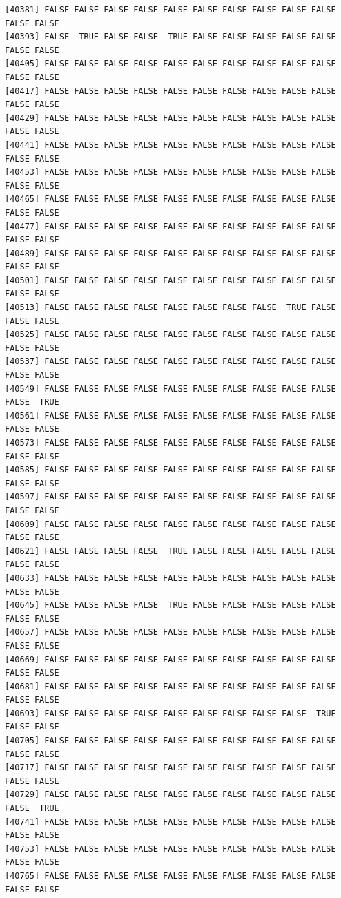\documentclass[
  a4paper,
  DIV=11,
  numbers=noendperiod]{scrartcl}
\begin{document}
\begin{verbatim}
[40381] FALSE FALSE FALSE FALSE FALSE FALSE FALSE FALSE FALSE FALSE FALSE FALSE
[40393] FALSE  TRUE FALSE FALSE  TRUE FALSE FALSE FALSE FALSE FALSE FALSE FALSE
[40405] FALSE FALSE FALSE FALSE FALSE FALSE FALSE FALSE FALSE FALSE FALSE FALSE
[40417] FALSE FALSE FALSE FALSE FALSE FALSE FALSE FALSE FALSE FALSE FALSE FALSE
[40429] FALSE FALSE FALSE FALSE FALSE FALSE FALSE FALSE FALSE FALSE FALSE FALSE
[40441] FALSE FALSE FALSE FALSE FALSE FALSE FALSE FALSE FALSE FALSE FALSE FALSE
[40453] FALSE FALSE FALSE FALSE FALSE FALSE FALSE FALSE FALSE FALSE FALSE FALSE
[40465] FALSE FALSE FALSE FALSE FALSE FALSE FALSE FALSE FALSE FALSE FALSE FALSE
[40477] FALSE FALSE FALSE FALSE FALSE FALSE FALSE FALSE FALSE FALSE FALSE FALSE
[40489] FALSE FALSE FALSE FALSE FALSE FALSE FALSE FALSE FALSE FALSE FALSE FALSE
[40501] FALSE FALSE FALSE FALSE FALSE FALSE FALSE FALSE FALSE FALSE FALSE FALSE
[40513] FALSE FALSE FALSE FALSE FALSE FALSE FALSE FALSE  TRUE FALSE FALSE FALSE
[40525] FALSE FALSE FALSE FALSE FALSE FALSE FALSE FALSE FALSE FALSE FALSE FALSE
[40537] FALSE FALSE FALSE FALSE FALSE FALSE FALSE FALSE FALSE FALSE FALSE FALSE
[40549] FALSE FALSE FALSE FALSE FALSE FALSE FALSE FALSE FALSE FALSE FALSE  TRUE
[40561] FALSE FALSE FALSE FALSE FALSE FALSE FALSE FALSE FALSE FALSE FALSE FALSE
[40573] FALSE FALSE FALSE FALSE FALSE FALSE FALSE FALSE FALSE FALSE FALSE FALSE
[40585] FALSE FALSE FALSE FALSE FALSE FALSE FALSE FALSE FALSE FALSE FALSE FALSE
[40597] FALSE FALSE FALSE FALSE FALSE FALSE FALSE FALSE FALSE FALSE FALSE FALSE
[40609] FALSE FALSE FALSE FALSE FALSE FALSE FALSE FALSE FALSE FALSE FALSE FALSE
[40621] FALSE FALSE FALSE FALSE  TRUE FALSE FALSE FALSE FALSE FALSE FALSE FALSE
[40633] FALSE FALSE FALSE FALSE FALSE FALSE FALSE FALSE FALSE FALSE FALSE FALSE
[40645] FALSE FALSE FALSE FALSE  TRUE FALSE FALSE FALSE FALSE FALSE FALSE FALSE
[40657] FALSE FALSE FALSE FALSE FALSE FALSE FALSE FALSE FALSE FALSE FALSE FALSE
[40669] FALSE FALSE FALSE FALSE FALSE FALSE FALSE FALSE FALSE FALSE FALSE FALSE
[40681] FALSE FALSE FALSE FALSE FALSE FALSE FALSE FALSE FALSE FALSE FALSE FALSE
[40693] FALSE FALSE FALSE FALSE FALSE FALSE FALSE FALSE FALSE  TRUE FALSE FALSE
[40705] FALSE FALSE FALSE FALSE FALSE FALSE FALSE FALSE FALSE FALSE FALSE FALSE
[40717] FALSE FALSE FALSE FALSE FALSE FALSE FALSE FALSE FALSE FALSE FALSE FALSE
[40729] FALSE FALSE FALSE FALSE FALSE FALSE FALSE FALSE FALSE FALSE FALSE  TRUE
[40741] FALSE FALSE FALSE FALSE FALSE FALSE FALSE FALSE FALSE FALSE FALSE FALSE
[40753] FALSE FALSE FALSE FALSE FALSE FALSE FALSE FALSE FALSE FALSE FALSE FALSE
[40765] FALSE FALSE FALSE FALSE FALSE FALSE FALSE FALSE FALSE FALSE FALSE FALSE

\end{verbatim}
\end{document}
